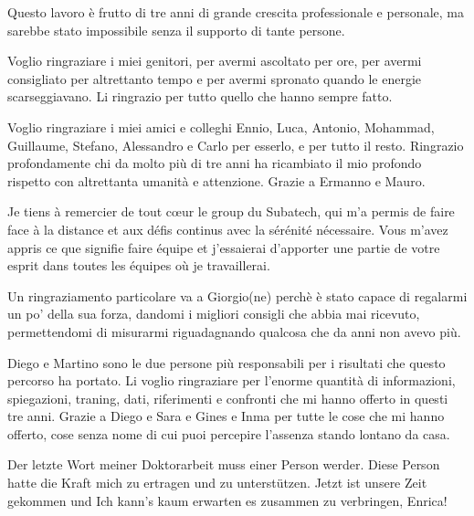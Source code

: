 
\begin{dedication} 

Questo lavoro è frutto di tre anni di grande crescita professionale e personale, ma sarebbe stato impossibile senza il supporto di tante persone.

Voglio ringraziare i miei genitori, per avermi ascoltato per ore, per avermi consigliato per altrettanto tempo e per avermi spronato quando le energie scarseggiavano. Li ringrazio per tutto quello che hanno sempre fatto.

Voglio ringraziare i miei amici e colleghi Ennio, Luca, Antonio, Mohammad, Guillaume, Stefano, Alessandro e Carlo per esserlo, e per tutto il resto.
Ringrazio profondamente chi da molto più di tre anni ha ricambiato il mio profondo rispetto con altrettanta umanità e attenzione. Grazie a Ermanno e Mauro.

Je tiens à remercier de tout cœur le group du Subatech, qui m'a permis de faire face à la distance et aux défis continus avec la sérénité nécessaire.
Vous m'avez appris ce que signifie faire équipe et j'essaierai d'apporter une partie de votre esprit dans toutes les équipes où je travaillerai.

Un ringraziamento particolare va a Giorgio(ne) perchè è stato capace di regalarmi un po' della sua forza, dandomi i migliori consigli che abbia mai ricevuto, permettendomi di misurarmi riguadagnando qualcosa che da anni non avevo più.

Diego e Martino sono le due persone più responsabili per i risultati che questo percorso ha portato. 
Li voglio ringraziare per l'enorme quantità di informazioni, spiegazioni, traning, dati, riferimenti e confronti che mi hanno offerto in questi tre anni.
Grazie a Diego e Sara e Gines e Inma per tutte le cose che mi hanno offerto, cose senza nome di cui puoi percepire l'assenza stando lontano da casa.

Der letzte Wort meiner Doktorarbeit muss einer Person werder.
Diese Person hatte die Kraft mich zu ertragen und zu unterstützen.
Jetzt ist unsere Zeit gekommen und Ich kann's kaum erwarten es zusammen zu verbringen, Enrica!


\end{dedication}